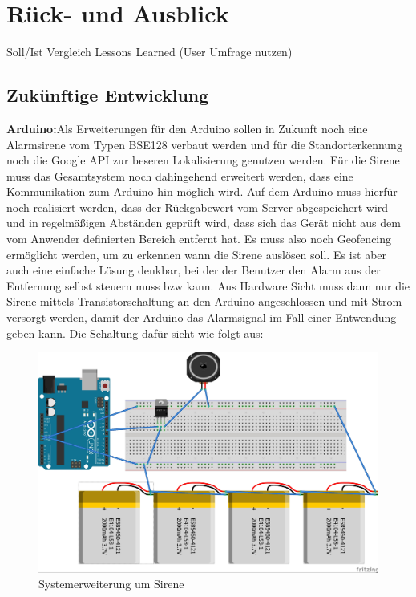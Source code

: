 \section{Rück- und Ausblick}
Soll/Ist Vergleich
Lessons Learned (User Umfrage nutzen)
\subsection{Zukünftige Entwicklung}
\textbf{Arduino:}Als Erweiterungen für den Arduino sollen in Zukunft noch eine Alarmsirene vom Typen BSE128 verbaut werden und für die Standorterkennung noch die Google API zur beseren Lokalisierung genutzen werden. 
Für die Sirene muss das Gesamtsystem noch dahingehend erweitert werden, dass eine Kommunikation zum Arduino hin möglich wird. Auf dem Arduino muss hierfür noch realisiert werden, dass der Rückgabewert vom Server abgespeichert wird und in regelmäßigen Abständen geprüft wird, dass sich das Gerät nicht aus dem vom Anwender definierten Bereich entfernt hat. Es muss also noch Geofencing ermöglicht werden, um zu erkennen wann die Sirene auslösen soll. Es ist aber auch eine einfache Lösung denkbar, bei der der Benutzer den Alarm aus der Entfernung selbst steuern muss bzw kann.
Aus Hardware Sicht muss dann nur die Sirene mittels Transistorschaltung an den Arduino angeschlossen und mit Strom versorgt werden, damit der Arduino das Alarmsignal im Fall einer Entwendung geben kann. Die Schaltung dafür sieht wie folgt aus:
\begin{figure} [H]
	\begin{center}
		\includegraphics[width=1\textwidth]{Bilder/Arduino_Sirene.jpg}
		\caption{Systemerweiterung um Sirene}
		\label{sirene}
	\end{center}
\end{figure}
